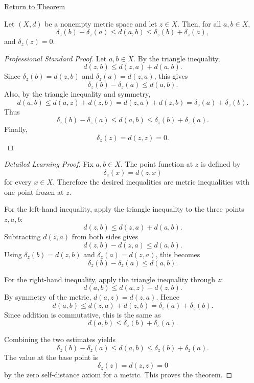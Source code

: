 \newpage
{}
\label{prf:metric-point-function-inequalities}

\begin{remark*}[Return]
\hyperref[thm:metric-point-function-inequalities]{Return to Theorem}
\end{remark*}

\begin{theorem*}
Let \((X,d)\) be a nonempty metric space and let \(z\in X\).  Then, for all
\(a,b\in X\),
\[
  \delta_z(b)-\delta_z(a)\leq d(a,b)\leq \delta_z(b)+\delta_z(a),
\]
and \(\delta_z(z)=0\).
\end{theorem*}

\begin{proof}[Professional Standard Proof]
\LRAProofBodyStart
Let \(a,b\in X\).  By the triangle inequality,
\[
  d(z,b)\leq d(z,a)+d(a,b).
\]
Since \(\delta_z(b)=d(z,b)\) and \(\delta_z(a)=d(z,a)\), this gives
\[
  \delta_z(b)-\delta_z(a)\leq d(a,b).
\]
Also, by the triangle inequality and symmetry,
\[
  d(a,b)\leq d(a,z)+d(z,b)=d(z,a)+d(z,b)
  =\delta_z(a)+\delta_z(b).
\]
Thus
\[
  \delta_z(b)-\delta_z(a)\leq d(a,b)\leq
  \delta_z(b)+\delta_z(a).
\]
Finally,
\[
  \delta_z(z)=d(z,z)=0.
\]
\end{proof}

\begin{proof}[Detailed Learning Proof]
\LRAProofBodyStart
Fix \(a,b\in X\).  The point function at \(z\) is defined by
\[
  \delta_z(x)=d(z,x)
\]
for every \(x\in X\).  Therefore the desired inequalities are metric
inequalities with one point frozen at \(z\).

For the left-hand inequality, apply the triangle inequality to the three
points \(z,a,b\):
\[
  d(z,b)\leq d(z,a)+d(a,b).
\]
Subtracting \(d(z,a)\) from both sides gives
\[
  d(z,b)-d(z,a)\leq d(a,b).
\]
Using \(\delta_z(b)=d(z,b)\) and \(\delta_z(a)=d(z,a)\), this becomes
\[
  \delta_z(b)-\delta_z(a)\leq d(a,b).
\]

For the right-hand inequality, apply the triangle inequality through \(z\):
\[
  d(a,b)\leq d(a,z)+d(z,b).
\]
By symmetry of the metric, \(d(a,z)=d(z,a)\).  Hence
\[
  d(a,b)\leq d(z,a)+d(z,b)
  =\delta_z(a)+\delta_z(b).
\]
Since addition is commutative, this is the same as
\[
  d(a,b)\leq \delta_z(b)+\delta_z(a).
\]

Combining the two estimates yields
\[
  \delta_z(b)-\delta_z(a)\leq d(a,b)\leq
  \delta_z(b)+\delta_z(a).
\]
The value at the base point is
\[
  \delta_z(z)=d(z,z)=0
\]
by the zero self-distance axiom for a metric.  This proves the theorem.
\end{proof}

